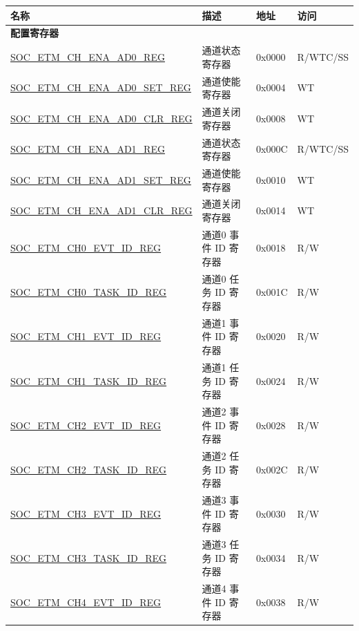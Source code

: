 \begin{longtable}{ | p{6cm} | p{6.2cm} | p{1.3cm} | p{2cm} | }
\hline\rowcolor{lightgray}
\textbf{名称} & \textbf{描述} &  \textbf{地址} & \textbf{访问} \\ \hline
\endhead
\multicolumn{4}{|l|}{\textbf{配置寄存器}} \\ \hline
\hyperref[regdesc:SOCETMCHENAAD0REG]{SOC\_ETM\_CH\_ENA\_AD0\_REG} & 通道状态寄存器 & 0x0000 & R/WTC/SS \\ \hline
\hyperref[regdesc:SOCETMCHENAAD0SETREG]{SOC\_ETM\_CH\_ENA\_AD0\_SET\_REG} & 通道使能寄存器 & 0x0004 & WT \\ \hline
\hyperref[regdesc:SOCETMCHENAAD0CLRREG]{SOC\_ETM\_CH\_ENA\_AD0\_CLR\_REG} & 通道关闭寄存器 & 0x0008 & WT \\ \hline
\hyperref[regdesc:SOCETMCHENAAD1REG]{SOC\_ETM\_CH\_ENA\_AD1\_REG} & 通道状态寄存器 & 0x000C & R/WTC/SS \\ \hline
\hyperref[regdesc:SOCETMCHENAAD1SETREG]{SOC\_ETM\_CH\_ENA\_AD1\_SET\_REG} & 通道使能寄存器 & 0x0010 & WT \\ \hline
\hyperref[regdesc:SOCETMCHENAAD1CLRREG]{SOC\_ETM\_CH\_ENA\_AD1\_CLR\_REG} & 通道关闭寄存器 & 0x0014 & WT \\ \hline
\hyperref[regdesc:SOCETMCH0EVTIDREG]{SOC\_ETM\_CH0\_EVT\_ID\_REG} & 通道0 事件 ID 寄存器 & 0x0018 & R/W \\ \hline
\hyperref[regdesc:SOCETMCH0TASKIDREG]{SOC\_ETM\_CH0\_TASK\_ID\_REG} & 通道0 任务 ID 寄存器 & 0x001C & R/W \\ \hline
\hyperref[regdesc:SOCETMCH0EVTIDREG]{SOC\_ETM\_CH1\_EVT\_ID\_REG} & 通道1 事件 ID 寄存器 & 0x0020 & R/W \\ \hline
\hyperref[regdesc:SOCETMCH0TASKIDREG]{SOC\_ETM\_CH1\_TASK\_ID\_REG} & 通道1 任务 ID 寄存器 & 0x0024 & R/W \\ \hline
\hyperref[regdesc:SOCETMCH0EVTIDREG]{SOC\_ETM\_CH2\_EVT\_ID\_REG} & 通道2 事件 ID 寄存器 & 0x0028 & R/W \\ \hline
\hyperref[regdesc:SOCETMCH0TASKIDREG]{SOC\_ETM\_CH2\_TASK\_ID\_REG} & 通道2 任务 ID 寄存器 & 0x002C & R/W \\ \hline
\hyperref[regdesc:SOCETMCH0EVTIDREG]{SOC\_ETM\_CH3\_EVT\_ID\_REG} & 通道3 事件 ID 寄存器 & 0x0030 & R/W \\ \hline
\hyperref[regdesc:SOCETMCH0TASKIDREG]{SOC\_ETM\_CH3\_TASK\_ID\_REG} & 通道3 任务 ID 寄存器 & 0x0034 & R/W \\ \hline
\hyperref[regdesc:SOCETMCH0EVTIDREG]{SOC\_ETM\_CH4\_EVT\_ID\_REG} & 通道4 事件 ID 寄存器 & 0x0038 & R/W \\ \hline

\end{longtable}
